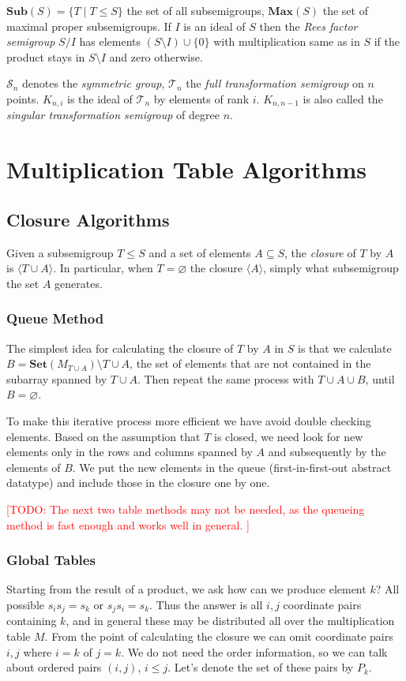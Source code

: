 \documentclass{amsart}
\newcommand{\cT}{{\mathcal T}}
\newcommand{\cS}{{\mathcal S}}
\newcommand{\Sub}{\mathbf{Sub}}
\newcommand{\Set}{\mathbf{Set}}
\newcommand{\Max}{\mathbf{Max}}
\newcommand{\todo}[1]{\textcolor{red}{ \small \textsf{[TODO:  #1 ]} \normalsize}}
\theoremstyle{plain}
\theoremstyle{definition}
\begin{document}
$\Sub(S)=\big\{T\mid T\leq S \big\}$ the set of all subsemigroups, $\Max(S)$ the set of maximal proper subsemigroups.
If $I$ is an ideal of $S$ then the \emph{Rees factor semigroup} $S/I$ has elements $(S\setminus I)\cup\{0\}$ with multiplication same as in $S$ if the product stays in $S\setminus I$ and zero otherwise.

$\cS_n$ denotes the \emph{symmetric group}, $\cT_n$ the \emph{full transformation semigroup} on $n$ points.
$K_{n,i}$ is the ideal of $\cT_n$ by elements of rank $i$.
$K_{n,n-1}$ is also called the \emph{singular transformation semigroup} of degree $n$.

\section{Multiplication Table Algorithms}
\label{sec:multab}

\subsection{Closure Algorithms}
Given a subsemigroup $T\leq S$ and a set of elements  $A\subseteq S$, the \emph{closure} of $T$ by $A$ is $\langle T\cup A \rangle$.
In particular, when $T=\varnothing$  the closure $\langle A\rangle$, simply  what subsemigroup the set $A$ generates.

\subsubsection{Queue Method}
The simplest idea for calculating the closure of $T$ by $A$ in $S$ is that we calculate $B=\Set\left(M_{T\cup A}\right)\setminus T\cup A$, the set of elements that are not contained in the subarray spanned by $T\cup A$. 
Then repeat the same process with $T\cup A\cup B$, until $B=\varnothing$.

To make this iterative process more efficient we have avoid double checking elements.
Based on the assumption that $T$ is closed, we need look for new elements only in the rows and columns spanned by $A$ and subsequently by the elements of $B$.
We put the new elements in the queue (first-in-first-out abstract datatype) and include those in the closure one by one.

\todo{The next two table methods may not be needed, as the queueing method is fast enough and works well in general.}
\subsubsection{Global Tables}
Starting from the result of a product, we ask how can we produce element $k$?
All possible $s_is_j=s_k$ or $s_js_i=s_k$.
Thus the  answer is all $i,j$ coordinate pairs containing $k$, and in general these may be distributed all over the multiplication table $M$.
From the point of calculating the closure we can  omit coordinate pairs $i,j$ where $i=k$ of $j=k$. 
We do not need the order information, so we can talk about ordered pairs $(i,j)$, $i\leq j$. 
Let's denote the set of these pairs by $P_k$.
\end{document}
